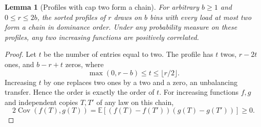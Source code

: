 \documentclass[11pt]{article}
\newtheorem{lemma}{Lemma}
\begin{document}
\begin{lemma}[Profiles with cap two form a chain]\label{lem:captwochain}
For arbitrary $b\geq1$ and $0\leq r\leq2b$, the sorted profiles of
$r$ draws on $b$ bins with every load at most two form a chain in
dominance order. Under any probability measure on these profiles,
any two increasing functions are positively correlated.
\end{lemma}
\begin{proof}
Let $t$ be the number of entries equal to two. The profile has
$t$ twos, $r-2t$ ones, and $b-r+t$ zeros, where
\[
 \max(0,r-b)\leq t\leq\lfloor r/2\rfloor.
\]
Increasing $t$ by one replaces two ones by a two and a zero,
an unbalancing transfer. Hence the order is exactly the order of $t$.
For increasing functions $f,g$ and independent copies $T,T'$ of any
law on this chain,
\[
 2\operatorname{Cov}(f(T),g(T))
 =\mathbb E[(f(T)-f(T'))(g(T)-g(T'))]\geq0.
\]
\end{proof}
\end{document}
